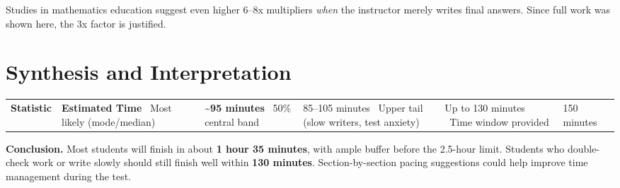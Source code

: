 \documentclass[12pt]{article}
\begin{document}
Studies in mathematics education suggest even higher 6--8x multipliers \emph{when} the instructor merely writes final answers. Since full work was shown here, the 3x factor is justified.

\section{Synthesis and Interpretation}
\begin{center} 
\renewcommand{\arraystretch}{1.3} 
\begin{tabular}{@{}ll@{}} \toprule \textbf{Statistic} & \textbf{Estimated Time} \ \midrule Most likely (mode/median) & \textbf{\textasciitilde95 minutes} \ 50\% central band & 85--105 minutes \ Upper tail (slow writers, test anxiety) & Up to 130 minutes \ Time window provided & 150 minutes \ \bottomrule \end{tabular} \end{center}

\textbf{Conclusion.} Most students will finish in about \textbf{1 hour 35 minutes}, with ample buffer before the 2.5-hour limit. Students who double-check work or write slowly should still finish well within \textbf{130 minutes}. Section-by-section pacing suggestions could help improve time management during the test.
\end{document}
